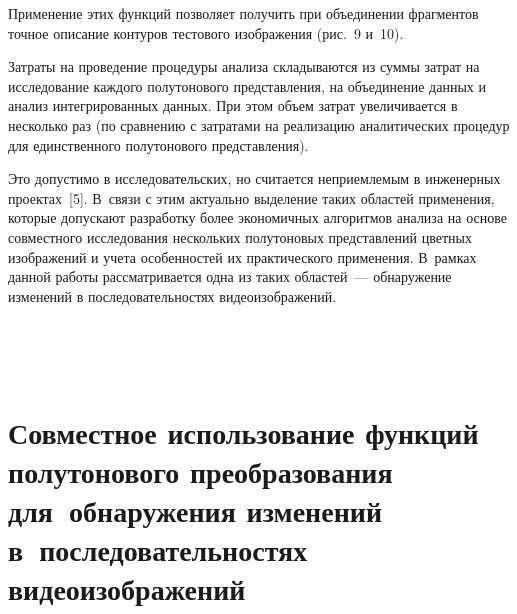 \begin{multicols}{2}
Применение этих функций позволяет получить при объединении фрагментов
точное описание контуров тестового изображения (рис.~9 и~10).

  Затраты на проведение процедуры анализа складываются из суммы затрат на
исследование каждого полутонового представления, на объединение данных и
анализ интегрированных данных. При этом объем затрат увеличивается в
несколько раз (по сравнению с затратами на реализацию аналитических
процедур для единственного полутонового представления).

  Это допустимо в исследовательских, но считается неприемлемым в
инженерных проектах~[5]. В~связи с этим актуально выделение таких областей
применения, которые допускают разработку более экономичных алгоритмов
анализа на основе совместного исследования нескольких полутоновых
представлений цветных изображений и учета особенностей их практического
применения. В~рамках данной работы рассматривается одна из таких
областей~--- обнаружение изменений в последовательностях
видеоизображений.

\begin{figure*} %
\vspace*{1pt}
\begin{center}
\mbox{%
\epsfxsize=128.18mm
}
\end{center}
\vspace*{-9pt}
\vspace*{1pt}
\begin{center}
\mbox{%
\epsfxsize=128.18mm
}
\end{center}
\vspace*{-9pt}
\end{figure*}

\vspace*{-6pt}

\section{Совместное использование функций полутонового
преобразования для~обнаружения изменений в~последовательностях
видеоизображений}


\end{multicols}
